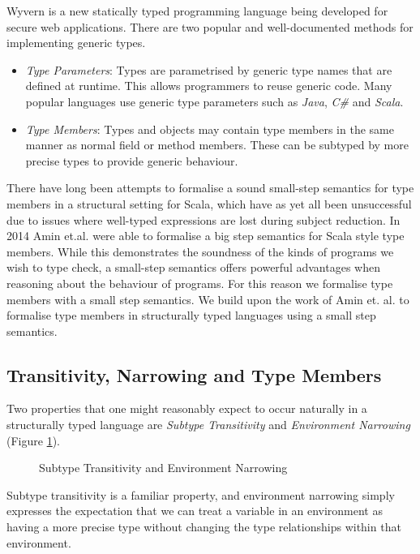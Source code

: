 \documentclass[11pt
              , a4paper
              , twoside
              , openright
              ]{report}
\numberwithin{case}{theorem}
\numberwithin{subcase}{case}
\begin{document}
Wyvern is a new statically typed programming language being developed for secure web applications. There are two popular and well-documented methods \cite{Virtual Types stuff, generic java etc} for implementing generic types.
\begin{itemize}
\item \emph{Type Parameters}: Types are parametrised by generic type names that are defined at runtime. This allows programmers to reuse generic code. Many popular languages use generic type parameters such as \emph{Java}, \emph{C\#} and \emph{Scala}.
\item \emph{Type Members}: Types and objects may contain type members in the same manner as normal field or method members. These can be subtyped by more precise types to provide generic behaviour.
\end{itemize}
There have long been attempts to formalise a sound small-step semantics for type members in a structural setting for Scala, which have as yet all been unsuccessful due to issues where well-typed expressions are lost during subject reduction. In 2014 Amin et.al. were able to formalise a big step semantics for Scala style type members. While this demonstrates the soundness of the kinds of programs we wish to type check, a small-step semantics offers powerful advantages when reasoning about the behaviour of programs. For this reason we formalise type members with a small step semantics.
We build upon the work of Amin et. al. \cite{Scala stuff} to formalise type members in structurally typed languages using a small step semantics. 

\subsection{Transitivity, Narrowing and Type Members}
\label{sec:trans_narow}
Two properties that one might reasonably expect 
to occur naturally in a structurally typed language are 
\emph{Subtype Transitivity} and \emph{Environment Narrowing}
(Figure \ref{f:trans_narrowing}).
\begin{figure}[h]
\caption{Subtype Transitivity and Environment Narrowing}
\label{f:trans_narrowing}
\end{figure}
Subtype transitivity is a familiar property, 
and environment narrowing simply expresses the 
expectation that we can treat a variable in an 
environment as having a more precise type without 
changing the type relationships within that environment.
\end{document}
